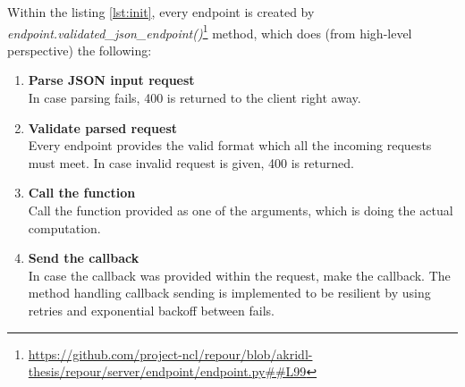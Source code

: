\documentclass[../main.tex]{subfiles}
\begin{document}
Within the listing \ref{lst:init}, every endpoint is created by \textit{endpoint.validated\_json\_endpoint()}\footnote{\url{https://github.com/project-ncl/repour/blob/akridl-thesis/repour/server/endpoint/endpoint.py##L99}} method, which does (from high-level perspective) the following:

\begin{enumerate}
    \item \textbf{Parse JSON input request}\\
    In case parsing fails, 400 is returned to the client right away.

    \item \textbf{Validate parsed request}\\
    Every endpoint provides the valid format which all the incoming requests must meet. In case invalid request is given, 400 is returned.

    \item \textbf{Call the function}\\
    Call the function provided as one of the arguments, which is doing the actual computation.

    \item \textbf{Send the callback}\\
    In case the callback was provided within the request, make the callback. The method handling callback sending is implemented to be resilient by using retries and exponential backoff between fails.

\end{enumerate}
\end{document}
